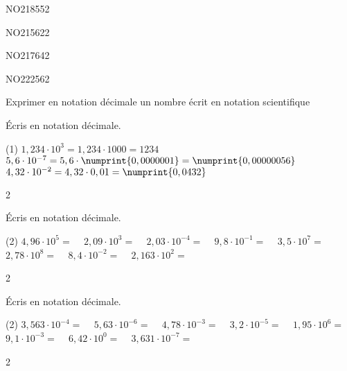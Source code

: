 \documentclass[a4paper,11pt]{report}
\begin{document}
\begin{exol}{NO218}{55}{2} %
\end{exol}

\begin{exof}{NO215}{62}{2} %
\end{exof}

\begin{exof}{NO217}{64}{2} %
\end{exof}

\begin{exol}{NO222}{56}{2} %
\end{exol}


\begin{resolu}{Exprimer en notation décimale un nombre écrit en notation scientifique}{
Écris en notation décimale.
\begin{tasks}(1)
    \task $1,234\cdot10^3=1,234\cdot1000=1234$
    \task $5,6\cdot10^{-7}=5,6\cdot\numprint{0,0000001}=\numprint{0,00000056}$
    \task $4,32\cdot10^{-2}=4,32\cdot0,01=\numprint{0,0432}$
\end{tasks}
}{2}
\end{resolu}


\begin{exop}{
Écris en notation décimale.

\begin{tasks}(2)
        \task $4,96\cdot10^5=$ \hrulefill~
        \task $2,09\cdot10^3=$ \hrulefill~
        \task $2,03\cdot10^{-4}=$ \hrulefill~
        \task $9,8\cdot10^{-1}=$ \hrulefill~
        \task $3,5\cdot10^{7}=$ \hrulefill~
        \task $2,78\cdot10^8=$ \hrulefill~
        \task $8,4\cdot10^{-2}=$ \hrulefill~
        \task $2,163\cdot10^{2}=$ \hrulefill~
    \end{tasks}
}{2}
\end{exop}

\begin{exop}{
Écris en notation décimale.

\begin{tasks}(2)
        \task $3,563\cdot10^{-4}=$ \hrulefill~
        \task $5,63\cdot10^{-6}=$ \hrulefill~
        \task $4,78\cdot10^{-3}=$ \hrulefill~
        \task $3,2\cdot10^{-5}=$ \hrulefill~
        \task $1,95\cdot10^{6}=$ \hrulefill~
        \task $9,1\cdot10^{-3}=$ \hrulefill~
        \task $6,42\cdot10^{0}=$ \hrulefill~
        \task $3,631\cdot10^{-7}=$ \hrulefill~
    \end{tasks}
}{2}
\end{exop}
\end{document}
